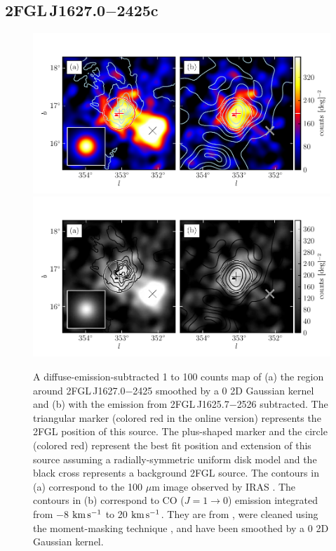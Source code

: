 \subsection{2FGL\,J1627.0$-$2425c}

\begin{figure}[htbp]
    \ifcolorfigure
      \includegraphics{source_plots/source_Ophiuchus_color.pdf}
    \else
      \includegraphics{source_plots/source_Ophiuchus_bw.pdf}
    \fi
  \caption{
  A diffuse-emission-subtracted 1 \gev to 100 \gev counts map of (a) the region
  around 2FGL\,J1627.0$-$2425 smoothed by a 0 2D Gaussian kernel and (b)
  with the emission from 2FGL\,J1625.7$-$2526
  subtracted.  The triangular marker 
  (colored red in the
  online version) represents the 2FGL position of this source.
  The plus-shaped marker and the circle (colored red) 
  represent the best fit position and extension of this
  source assuming a radially-symmetric uniform disk model
  and the black cross represents a background 2FGL source. 
  The
  contours in (a) correspond to the 100 $\mu$m image observed by
  IRAS \citep{young_1986a_high-resolution-observations}.  The contours in (b) correspond to
  CO ($J=1\rightarrow 0$) emission integrated from $-$8 $\text{km}\,\text{s}^{-1}$
  to 20 $\text{km}\,\text{s}^{-1}$.  They are from \cite{de-geus_1990a_survey-clouds}, were cleaned using
  the moment-masking technique \citep{dame_2011a_optimization-moment}, and have
  been smoothed by a 0 2D Gaussian kernel.
  }
\end{figure}


